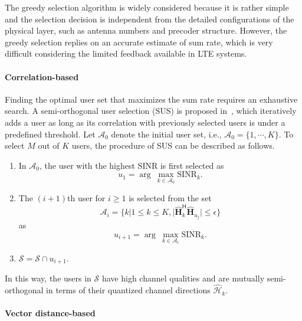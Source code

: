 \documentclass[a4paper,12pt]{article}%
\begin{document}
The greedy selection algorithm is widely considered because it is rather simple and the selection decision is independent from the detailed configurations of the physical layer, such as antenna numbers and precoder structure. However, the greedy selection replies on an accurate estimate of sum rate, which is very difficult considering the limited feedback available in LTE systems.

\paragraph{Correlation-based}

Finding the optimal user set that maximizes the sum rate requires an exhaustive search. A semi-orthogonal user selection (SUS) is proposed in~\cite{Yoo2006}, which iteratively adds a user as long as its correlation with previously selected users is under a predefined threshold. Let $\mathcal{A}_0$ denote the initial user set, i.e., $\mathcal{A}_0=\{1,\cdots,K\}$. To select $M$ out of $K$ users, the procedure of SUS can be described as follows.

\begin{enumerate}
\item In $\mathcal{A}_0$, the user with the highest SINR is first selected as
\begin{equation}
u_1 = \arg~\max_{k\in \mathcal{A}_0} \text{SINR}_k.
\end{equation}
\item The $(i+1)$th user for $i \geq 1$ is selected from the set
\begin{equation}
\mathcal{A}_i=\{k | 1 \leq k \leq K, |\hat{\mathbf{H}}_k^{\mathsf{H}} \hat{\mathbf{H}}_{u_j}| \leq \epsilon \}
\end{equation}
as
\begin{equation}
u_{i+1} = \arg~\max_{k\in \mathcal{A}_i} \text{SINR}_k.
\end{equation}
\item $\mathcal{S}=\mathcal{S} \cap u_{i+1}$.
\end{enumerate}
In this way, the users in $\mathcal{S}$ have high channel qualities and are mutually semi-orthogonal in terms of their quantized channel directions $\hat{\mathcal{H}}_k$.

\paragraph{Vector distance-based}
\end{document}
